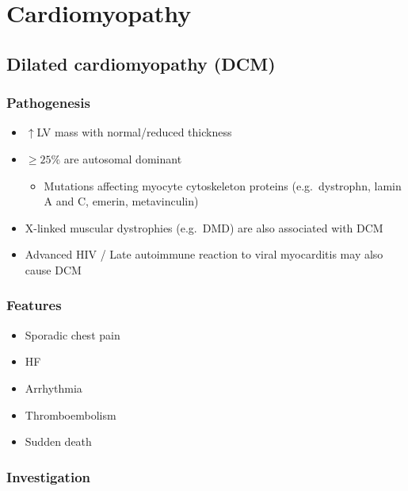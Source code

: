 \documentclass[
  12pt,
]{memoir}
\providecommand{\tightlist}{%
  \setlength{\itemsep}{0pt}\setlength{\parskip}{0pt}}
\begin{document}
\hypertarget{cardiomyopathy}{%
\section{Cardiomyopathy}\label{cardiomyopathy}}

\hypertarget{dilated-cardiomyopathy-dcm}{%
\subsection{Dilated cardiomyopathy
(DCM)}\label{dilated-cardiomyopathy-dcm}}

\hypertarget{pathogenesis-10}{%
\subsubsection{Pathogenesis}\label{pathogenesis-10}}

\begin{itemize}
\tightlist
\item
  \(\uparrow\)LV mass with normal/reduced thickness
\item
  \(\ge 25\%\) are autosomal dominant

  \begin{itemize}
  \tightlist
  \item
    Mutations affecting myocyte cytoskeleton proteins (e.g.~dystrophn,
    lamin A and C, emerin, metavinculin)
  \end{itemize}
\item
  X-linked muscular dystrophies (e.g.~DMD) are also associated with DCM
\item
  Advanced HIV / Late autoimmune reaction to viral myocarditis may also
  cause DCM
\end{itemize}

\hypertarget{features-14}{%
\subsubsection{Features}\label{features-14}}

\begin{itemize}
\tightlist
\item
  Sporadic chest pain
\item
  HF
\item
  Arrhythmia
\item
  Thromboembolism
\item
  Sudden death
\end{itemize}

\hypertarget{investigation-17}{%
\subsubsection{Investigation}\label{investigation-17}}
\end{document}
